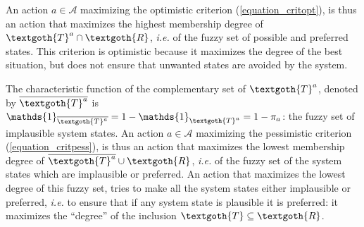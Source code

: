 An action $a \in \mathcal{A}$ maximizing the optimistic criterion (\ref{equation_critopt}),
is thus an action that maximizes the highest membership degree of $\textgoth{T}^a \cap \textgoth{R}$,
\textit{i.e.} of the fuzzy set of possible and preferred states.
This criterion is optimistic because it maximizes
the degree of the best situation, but does not ensure that 
unwanted states are avoided by the system.
 
The characteristic function of the complementary set of $\textgoth{T}^a$, denoted by $\overline{\textgoth{T}^a}$ 
is $\mathds{1}_{\overline{\textgoth{T}^a}} = 1 - \mathds{1}_{\textgoth{T}^a} = 1- \pi_a$:
the fuzzy set of implausible system states.
An action $a \in \mathcal{A}$ maximizing the pessimistic criterion (\ref{equation_critpess}),
is thus an action that maximizes the lowest membership degree of $\overline{\textgoth{T}^a} \cup \textgoth{R}$,
\textit{i.e.} of the fuzzy set of the system states which are implausible or preferred.
An action that maximizes the lowest degree of this fuzzy set,
tries to make all the system states either implausible or preferred,
\textit{i.e.} to ensure that if any system state is plausible it is preferred:
it maximizes the ``degree'' of the inclusion $\textgoth{T} \subseteq \textgoth{R}$.


